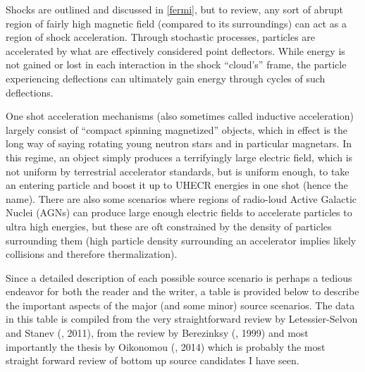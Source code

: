 Shocks are outlined and discussed in \autoref{fermi}, but to review, any sort of abrupt region of fairly high magnetic field (compared to its surroundings) can act as a region of shock acceleration. Through stochastic processes, particles are accelerated by what are effectively considered point deflectors. While energy is not gained or lost in each interaction in the shock ``cloud's'' frame, the particle experiencing deflections can ultimately gain energy through cycles of such deflections.

One shot acceleration mechanisms (also sometimes called inductive acceleration) largely consist of ``compact spinning magnetized'' objects, which in effect is the long way of saying rotating young neutron stars and in particular magnetars. In this regime, an object simply produces a terrifyingly large electric field, which is not uniform by terrestrial accelerator standards, but is uniform enough, to take an entering particle and boost it up to UHECR energies in one shot (hence the name). There are also some scenarios where regions of radio-loud Active Galactic Nuclei (AGNs) can produce large enough electric fields to accelerate particles to ultra high energies, but these are oft constrained by the density of particles surrounding them (high particle density surrounding an accelerator implies likely collisions and therefore thermalization). 

Since a detailed description of each possible source scenario is perhaps a tedious endeavor for both the reader and the writer, a table is provided below to describe the important aspects of the major (and some minor) source scenarios. The data in this table is compiled from the very straightforward review by Letessier-Selvon and Stanev (\cite{stanev}, 2011), from the review by Berezinksy (\cite{tds}, 1999) and most importantly the thesis by Oikonomou (\cite{foteini}, 2014) which is probably the most straight forward review of bottom up source candidates I have seen.
\newpage
{}

